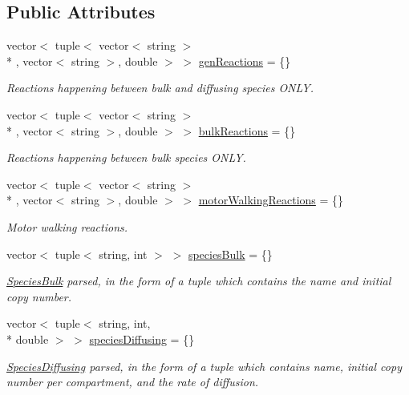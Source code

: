 \subsection*{Public Attributes}
\begin{DoxyCompactItemize}
\item 
vector$<$ tuple$<$ vector$<$ string $>$\\*
, vector$<$ string $>$, double $>$ $>$ \hyperlink{structChemistryData_a4faa68797fd22c5247b9b52a9057023a}{gen\+Reactions} = \{\}
\begin{DoxyCompactList}\small\item\em Reactions happening between bulk and diffusing species O\+N\+L\+Y. \end{DoxyCompactList}\item 
vector$<$ tuple$<$ vector$<$ string $>$\\*
, vector$<$ string $>$, double $>$ $>$ \hyperlink{structChemistryData_a18d2b4d3d417507768bb50f7f43f427b}{bulk\+Reactions} = \{\}
\begin{DoxyCompactList}\small\item\em Reactions happening between bulk species O\+N\+L\+Y. \end{DoxyCompactList}\item 
vector$<$ tuple$<$ vector$<$ string $>$\\*
, vector$<$ string $>$, double $>$ $>$ \hyperlink{structChemistryData_a96d5d5289ae3651ab139b1de586b80e7}{motor\+Walking\+Reactions} = \{\}
\begin{DoxyCompactList}\small\item\em Motor walking reactions. \end{DoxyCompactList}\item 
vector$<$ tuple$<$ string, int $>$ $>$ \hyperlink{structChemistryData_ae9c303af6cd6b503fe45515c4ee5132b}{species\+Bulk} = \{\}
\begin{DoxyCompactList}\small\item\em \hyperlink{classSpeciesBulk}{Species\+Bulk} parsed, in the form of a tuple which contains the name and initial copy number. \end{DoxyCompactList}\item 
vector$<$ tuple$<$ string, int, \\*
double $>$ $>$ \hyperlink{structChemistryData_acf21fd3143fa3bc4e0e1097ce15cb77c}{species\+Diffusing} = \{\}
\begin{DoxyCompactList}\small\item\em \hyperlink{classSpeciesDiffusing}{Species\+Diffusing} parsed, in the form of a tuple which contains name, initial copy number per compartment, and the rate of diffusion. \end{DoxyCompactList}\end{DoxyCompactItemize}
